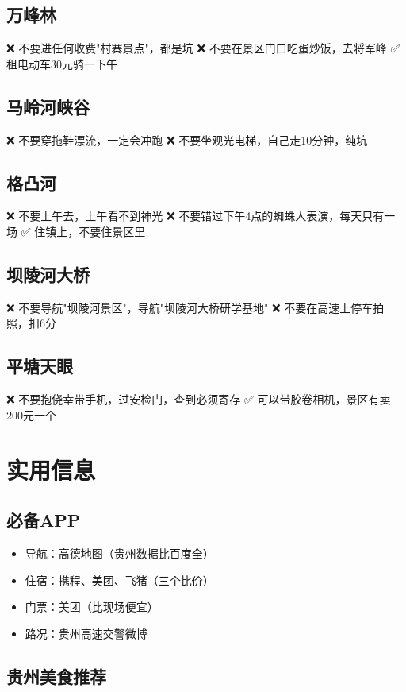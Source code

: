 \documentclass[12pt,a4paper,UTF8]{ctexart}
\begin{document}
\subsection{万峰林}
❌ 不要进任何收费"村寨景点"，都是坑
❌ 不要在景区门口吃蛋炒饭，去将军峰
✅ 租电动车30元骑一下午

\subsection{马岭河峡谷}
❌ 不要穿拖鞋漂流，一定会冲跑
❌ 不要坐观光电梯，自己走10分钟，纯坑

\subsection{格凸河}
❌ 不要上午去，上午看不到神光
❌ 不要错过下午4点的蜘蛛人表演，每天只有一场
✅ 住镇上，不要住景区里

\subsection{坝陵河大桥}
❌ 不要导航"坝陵河景区"，导航"坝陵河大桥研学基地"
❌ 不要在高速上停车拍照，扣6分

\subsection{平塘天眼}
❌ 不要抱侥幸带手机，过安检门，查到必须寄存
✅ 可以带胶卷相机，景区有卖200元一个

\newpage

\section{实用信息}

\subsection{必备APP}
\begin{itemize}
\item 导航：高德地图（贵州数据比百度全）
\item 住宿：携程、美团、飞猪（三个比价）
\item 门票：美团（比现场便宜）
\item 路况：贵州高速交警微博
\end{itemize}

\subsection{贵州美食推荐}
\end{document}

